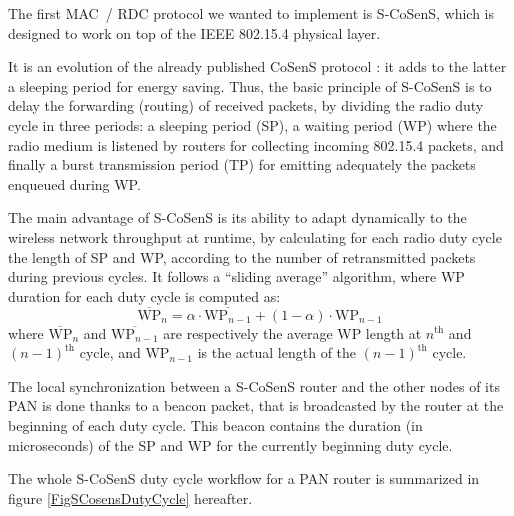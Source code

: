 \documentclass[a4paper,twoside]{article}
\begin{document}
The first MAC~/ RDC protocol we wanted to implement is S-CoSenS, which
is designed to work on top of the IEEE 802.15.4 physical layer.

It is an evolution of the already published CoSenS protocol \cite{CosensConf}:
it adds to the latter a sleeping period for energy saving.
Thus, the basic principle of S-CoSenS is to delay the forwarding (routing)
of received packets, by dividing the radio duty cycle in three periods:
a sleeping period (SP), a waiting period (WP) where the radio medium
is listened by routers for collecting incoming 802.15.4 packets, and
finally a burst transmission period (TP) for emitting adequately
the packets enqueued during WP.

The main advantage of S-CoSenS is its ability to adapt dynamically to the
wireless network throughput at runtime, by calculating for each radio duty
cycle the length of SP and WP, according to the number of retransmitted
packets during previous cycles. It follows a ``sliding average''
algorithm, where WP duration for each duty cycle is computed as:
\begin{displaymath}
\overline{\mathrm{WP}}_{n} = \alpha \cdot \overline{\mathrm{WP}_{n-1}}
                + (1 - \alpha) \cdot \mathrm{WP}_{n-1}
\end{displaymath}
where $\overline{\mathrm{WP}}_{n}$ and $\overline{\mathrm{WP}_{n-1}}$
are respectively the average WP length at $n^{\mathrm{th}}$ and
$(n-1)^{\mathrm{th}}$ cycle, and $\mathrm{WP}_{n-1}$ is the actual
length of the $(n-1)^{\mathrm{th}}$ cycle.

The local synchronization between a S-CoSenS router and the other nodes
of its PAN is done thanks to a beacon packet, that is broadcasted by
the router at the beginning of each duty cycle. This beacon contains the
duration (in microseconds) of the SP and WP for the currently beginning
duty cycle.

The whole S-CoSenS duty cycle workflow for a PAN router is summarized
in figure \ref{FigSCosensDutyCycle} hereafter.
\end{document}
